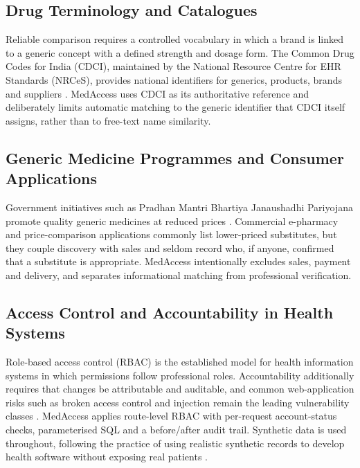 \documentclass[conference]{IEEEtran}
\begin{document}
\subsection{Drug Terminology and Catalogues}
Reliable comparison requires a controlled vocabulary in which a brand is linked to a generic concept with a defined strength and dosage form. The Common Drug Codes for India (CDCI), maintained by the National Resource Centre for EHR Standards (NRCeS), provides national identifiers for generics, products, brands and suppliers \cite{cdci}. MedAccess uses CDCI as its authoritative reference and deliberately limits automatic matching to the generic identifier that CDCI itself assigns, rather than to free-text name similarity.

\subsection{Generic Medicine Programmes and Consumer Applications}
Government initiatives such as Pradhan Mantri Bhartiya Janaushadhi Pariyojana promote quality generic medicines at reduced prices \cite{pmbjp}. Commercial e-pharmacy and price-comparison applications commonly list lower-priced substitutes, but they couple discovery with sales and seldom record who, if anyone, confirmed that a substitute is appropriate. MedAccess intentionally excludes sales, payment and delivery, and separates informational matching from professional verification.

\subsection{Access Control and Accountability in Health Systems}
Role-based access control (RBAC) \cite{sandhu1996,ferraiolo2001} is the established model for health information systems in which permissions follow professional roles. Accountability additionally requires that changes be attributable and auditable, and common web-application risks such as broken access control and injection remain the leading vulnerability classes \cite{owasp2021}. MedAccess applies route-level RBAC with per-request account-status checks, parameterised SQL and a before/after audit trail. Synthetic data is used throughout, following the practice of using realistic synthetic records to develop health software without exposing real patients \cite{synthea}.

\end{document}
